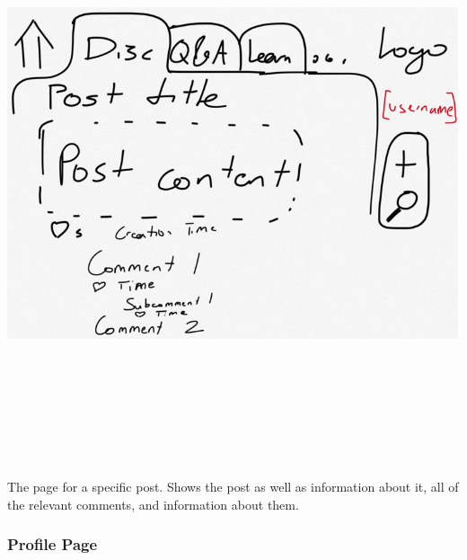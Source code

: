 \documentclass[12pt]{scrartcl}
\begin{document}
\includegraphics[width=17cm, height=17cm, keepaspectratio]{postpage.png}

The page for a specific post. Shows the post as well as information about it, all of the relevant comments, and information about them.

\subsubsection{Profile Page}
\end{document}
